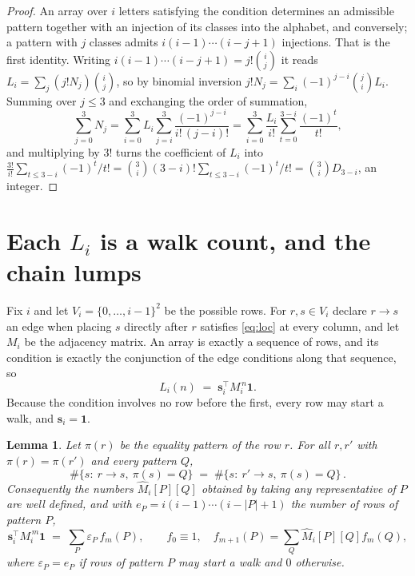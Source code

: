 \documentclass[11pt,a4paper]{article}
\theoremstyle{plain}
\newtheorem{lemma}[theorem]{Lemma}
\theoremstyle{definition}
\begin{document}
\begin{proof}
An array over $i$ letters satisfying the condition determines an admissible pattern together
with an injection of its classes into the alphabet, and conversely; a pattern with $j$
classes admits $i(i-1)\cdots(i-j+1)$ injections. That is the first identity. Writing
$i(i-1)\cdots(i-j+1)=j!\binom{i}{j}$ it reads $L_i=\sum_j (j!N_j)\binom{i}{j}$, so by
binomial inversion $j!N_j=\sum_{i}(-1)^{j-i}\binom{j}{i}L_i$. Summing over
$j\le 3$ and exchanging the order of summation,
\[
\sum_{j=0}^{3}N_j=\sum_{i=0}^{3}L_i\sum_{j=i}^{3}\frac{(-1)^{j-i}}{i!\,(j-i)!}
=\sum_{i=0}^{3}\frac{L_i}{i!}\sum_{t=0}^{3-i}\frac{(-1)^t}{t!} ,
\]
and multiplying by $3!$ turns the coefficient of $L_i$ into
$\frac{3!}{i!}\sum_{t\le 3-i}(-1)^t/t!=\binom{3}{i}(3-i)!\sum_{t\le 3-i}(-1)^t/t!
=\binom{3}{i}D_{3-i}$, an integer.
\end{proof}

\section{Each $L_i$ is a walk count, and the chain lumps}

Fix $i$ and let $V_i=\{0,\dots,i-1\}^{2}$ be the possible rows. For $r,s\in V_i$
declare $r\to s$ an edge when placing $s$ directly after $r$ satisfies \eqref{eq:loc} at
every column, and let $M_i$ be the adjacency matrix. An array is exactly a sequence of
rows, and its condition is exactly the conjunction of the edge conditions along that
sequence, so
\[
L_i(n)\;=\;\mathbf{s}_i^{\!\top}M_i^{\,n}\mathbf{1} .
\]
Because the condition involves no row before the first, every
row may start a walk, and $\mathbf{s}_i=\mathbf{1}$.

\begin{lemma}\label{lem:lump}
Let $\pi(r)$ be the equality pattern of the row $r$. For all $r,r'$ with
$\pi(r)=\pi(r')$ and every pattern $Q$,
\[
\#\{s:\ r\to s,\ \pi(s)=Q\}\;=\;\#\{s:\ r'\to s,\ \pi(s)=Q\}\, .
\]
Consequently the numbers $\widehat M_i[P][Q]$ obtained by taking any representative of $P$
are well defined, and with $e_P=i(i-1)\cdots(i-|P|+1)$ the number of rows of pattern $P$,
\[
\mathbf{s}_i^{\!\top}M_i^{\,m}\mathbf{1}\;=\;\sum_P \varepsilon_P\,f_m(P),
\qquad f_0\equiv1,\quad f_{m+1}(P)=\sum_Q\widehat M_i[P][Q]f_m(Q),
\]
where $\varepsilon_P=e_P$ if rows of pattern $P$ may start a walk and $0$ otherwise.
\end{lemma}
\end{document}
